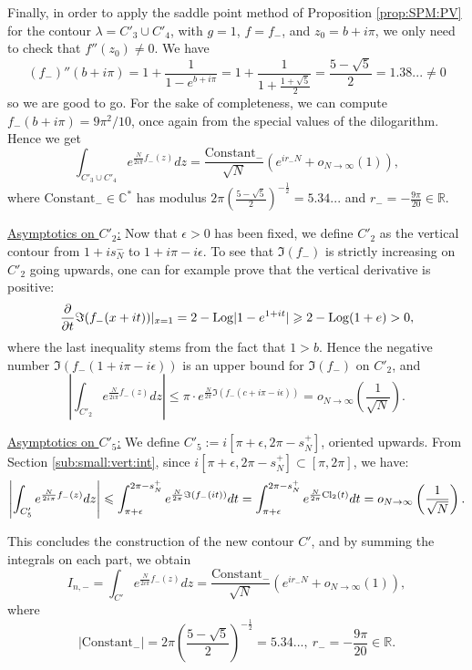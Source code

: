 \documentclass[11pt]{amsart}
\newcommand{\R}{\mathbb{R}}
\newcommand{\C}{\mathbb{C}}
\newcommand{\Log}{{\rm Log}}
\begin{document}
{Finally, in order to apply the saddle point method of Proposition \ref{prop:SPM:PV} for the contour $\lambda=C'_3\cup C'_4$, with $g=1$, $f=f_-$, and $z_0=b+i\pi$, we only need to check that $f''(z_0) \neq 0$. We have 
$$(f_-)''(b+i\pi)=1+\frac{1}{1-e^{b+i\pi}}= 1+ \frac{1}{1+\frac{1+\sqrt{5}}{2}}=\frac{5-\sqrt{5}}{2} =1.38... \neq 0$$ so we are good to go. For the sake of completeness, we can compute $f_-(b+i\pi) = 9\pi^2/10$, once again from the special values of the dilogarithm. Hence we get
$$ \int_{C'_3\cup C'_4} e^{\frac{N}{2 i \pi}f_-(z)}dz = \dfrac{\text{Constant}_-}{\sqrt{N}}(e^{i r_- N}+o_{N\to\infty}(1)),$$
where $\text{Constant}_- \in \C^*$ has modulus $2\pi \left (\frac{5-\sqrt{5}}{2}\right )^{-\frac{1}{2}}=5.34...$ and $r_-=-\frac{9 \pi}{20} \in \R$.
\smallskip

\underline{Asymptotics on $C'_2$:} Now that $\epsilon>0$ has been fixed, we define $C'_2$ as the vertical contour from $1+is_N^-$ to $1+i\pi-i\epsilon$.
To see that $\Im(f_-)$ is strictly increasing on $C'_2$ going upwards, one can for example prove that the vertical derivative is positive:
$$\dfrac{\partial}{\partial t} \Im (f_-(x+it)) \vert_{x=1}
= 2 - \Log \vert 1-e^{1+it} \vert \geqslant 2-\Log(1+e)>0,$$
where the last inequality stems from the fact that $1>b$. Hence the negative number $\Im \left (f_-\left (1+i\pi-i\epsilon\right )\right )$ is an upper bound for $\Im(f_-)$ on $C'_2$, and
$$ \left |\int_{C'_2} e^{\frac{N}{2 i \pi}f_-(z)}dz\right | \leqslant
\pi \cdot e^{\frac{N}{2 \pi}\Im \left (f_-\left (c+i\pi-i\epsilon\right )\right )} = o_{N\to \infty}\left (\frac{1}{\sqrt{N}}\right ).$$

\underline{Asymptotics on $C'_5$:} We define $C'_5:=i[\pi+\epsilon,2\pi-s_N^+]$, oriented upwards. From Section \ref{sub:small:vert:int}, since $i[\pi+\epsilon,2\pi-s_N^+] \subset [\pi,2\pi]$, we have:
$$ \left |\int_{C'_5} e^{\frac{N}{2 i \pi}f_-(z)}dz\right | \leqslant
\int_{\pi+\epsilon}^{2\pi-s_N^+} e^{\frac{N}{2 \pi}\Im(f_-(it))}dt=
\int_{\pi+\epsilon}^{2\pi-s_N^+} e^{\frac{N}{2 \pi}{\rm Cl}_2(t)}dt = o_{N\to \infty}\left (\frac{1}{\sqrt{N}}\right ).$$


This concludes the construction of the new contour $C'$, and by summing the integrals on each part, we obtain
$$ I_{n,-}=\int_{C'} e^{\frac{N}{2 i \pi}f_-(z)}dz = \dfrac{\text{Constant}_-}{\sqrt{N}}(e^{i r_- N}+o_{N\to\infty}(1)),$$
where
\begin{equation}\label{Cst-}
\vert \mathrm{Constant}_- \vert = 2\pi \left (\frac{5-\sqrt{5}}{2}\right )^{-\frac{1}{2}}=5.34..., \ r_-=-\frac{9 \pi}{20} \in \R.
\end{equation}

}
\end{document}
